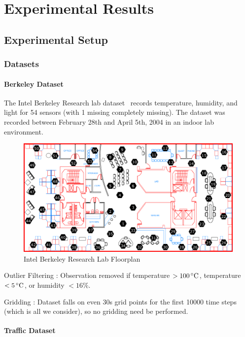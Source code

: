 \section{Experimental Results}  \label{sec:exp}

\subsection{Experimental Setup}

\subsubsection{Datasets}

\paragraph*{Berkeley Dataset}

The Intel Berkeley Research lab dataset~\cite{berkeley2004lab} records temperature, humidity, and light for 54 sensors (with 1 missing completely missing).
The dataset was recorded between February 28th and April 5th, 2004 in an indoor lab environment.

\begin{figure}
\centering
\includegraphics[scale=0.25]{berkeley_lab.png}
\caption{Intel Berkeley Research Lab Floorplan}
\end{figure}

Outlier Filtering : Observation removed if temperature $> 100\,^{\circ}\mathrm{C}$, temperature $< 5\,^{\circ}\mathrm{C}$, or humidity $< 16\%$.

Gridding : Dataset falls on even 30s grid points for the first 10000 time steps (which is all we consider), so no gridding need be performed.

\paragraph*{Traffic Dataset}

